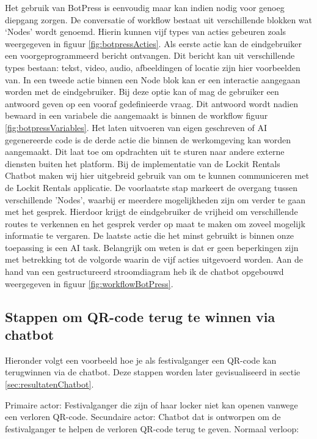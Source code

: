 Het gebruik van BotPress is eenvoudig maar kan indien nodig voor genoeg diepgang zorgen. De conversatie of workflow bestaat uit verschillende blokken wat ‘Nodes’ wordt genoemd. Hierin kunnen vijf types van acties gebeuren zoals weergegeven in figuur \ref{fig:botpressActies}. Als eerste actie kan de eindgebruiker een voorgeprogrammeerd bericht ontvangen. Dit bericht kan uit verschillende types bestaan: tekst, video, audio, afbeeldingen of locatie zijn hier voorbeelden van. In een tweede actie binnen een Node blok kan er een interactie aangegaan worden met de eindgebruiker. Bij deze optie kan of mag de gebruiker een antwoord geven op een vooraf gedefinieerde vraag. Dit antwoord wordt nadien bewaard in een variabele die aangemaakt is binnen de workflow figuur \ref{fig:botpressVariables}. Het laten uitvoeren van eigen geschreven of \ac{AI} gegenereerde code is de derde actie die binnen de werkomgeving kan worden aangemaakt. Dit laat toe om opdrachten uit te sturen naar andere externe diensten buiten het platform. Bij de implementatie van de Lockit Rentals Chatbot maken wij hier uitgebreid gebruik van om te kunnen communiceren met de Lockit Rentals applicatie. De voorlaatste stap markeert de overgang tussen verschillende 'Nodes', waarbij er meerdere mogelijkheden zijn om verder te gaan met het gesprek. Hierdoor krijgt de eindgebruiker de vrijheid om verschillende routes te verkennen en het gesprek verder op maat te maken om zoveel mogelijk informatie te vergaren. De laatste actie die het minst gebruikt is binnen onze toepassing is een \ac{AI} task. 
Belangrijk om weten is dat er geen beperkingen zijn met betrekking tot de volgorde waarin de vijf acties uitgevoerd worden. Aan de hand van een gestructureerd stroomdiagram heb ik de chatbot opgebouwd weergegeven in figuur \ref{fig:workflowBotPress}. 

\subsection{Stappen om QR-code terug te winnen via chatbot}
\label{sec:stappenChatbot}
Hieronder volgt een voorbeeld hoe je als festivalganger een QR-code kan terugwinnen via de chatbot. Deze stappen worden later gevisualiseerd in sectie \ref{sec:resultatenChatbot}.
\newline

Primaire actor: Festivalganger die zijn of haar locker niet kan openen vanwege een verloren QR-code.
\newline
Secundaire actor: Chatbot dat is ontworpen om de festivalganger te helpen de verloren QR-code terug te geven.
\newline
Normaal verloop:

